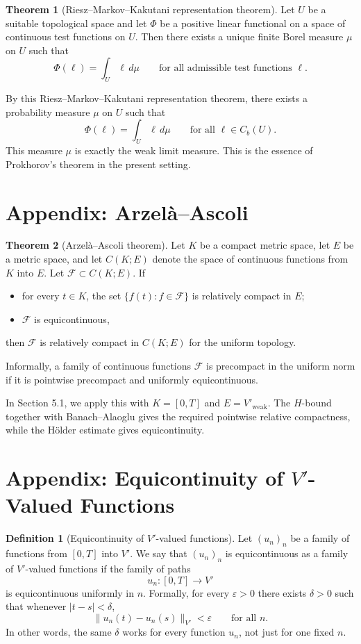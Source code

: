 \documentclass[11pt]{article}
\theoremstyle{definition}
\newtheorem{definition}{Definition}
\newtheorem{theorem}{Theorem}
\theoremstyle{remark}
\begin{document}
\begin{theorem}[Riesz--Markov--Kakutani representation theorem]
Let $U$ be a suitable topological space and let $\Phi$ be a positive linear functional on a space of continuous test functions on $U$. Then there exists a unique finite Borel measure $\mu$ on $U$ such that
\[
  \Phi(\ell)=\int_U \ell\,d\mu
  \qquad \text{for all admissible test functions } \ell.
\]
\end{theorem}

By this Riesz--Markov--Kakutani representation theorem, there exists a probability measure $\mu$ on $U$ such that
\[
  \Phi(\ell)=\int_U \ell\,d\mu
  \qquad \text{for all } \ell\in C_b(U).
\]
This measure $\mu$ is exactly the weak limit measure. This is the essence of Prokhorov's theorem in the present setting.

\section*{Appendix: Arzel\`a--Ascoli}
\begin{theorem}[Arzel\`a--Ascoli theorem]
Let $K$ be a compact metric space, let $E$ be a metric space, and let $C(K;E)$ denote the space of continuous functions from $K$ into $E$. Let $\mathcal F\subset C(K;E)$. If
\begin{itemize}
\item for every $t\in K$, the set $\{f(t):f\in \mathcal F\}$ is relatively compact in $E$;
\item $\mathcal F$ is equicontinuous,
\end{itemize}
then $\mathcal F$ is relatively compact in $C(K;E)$ for the uniform topology.
\end{theorem}

Informally, a family of continuous functions $\mathcal F$ is precompact in the uniform norm if it is pointwise precompact and uniformly equicontinuous.

In Section 5.1, we apply this with $K=[0,T]$ and $E=V'_{\mathrm{weak}}$. The $H$-bound together with Banach--Alaoglu gives the required pointwise relative compactness, while the H\"older estimate gives equicontinuity.

\section*{Appendix: Equicontinuity of $V'$-Valued Functions}
\begin{definition}[Equicontinuity of $V'$-valued functions]
Let $(u_n)_n$ be a family of functions from $[0,T]$ into $V'$. We say that $(u_n)_n$ is equicontinuous as a family of $V'$-valued functions if the family of paths
\[
  u_n:[0,T]\to V'
\]
is equicontinuous uniformly in $n$. Formally, for every $\varepsilon>0$ there exists $\delta>0$ such that whenever $|t-s|<\delta$,
\[
  \|u_n(t)-u_n(s)\|_{V'}<\varepsilon
  \qquad \text{for all } n.
\]
In other words, the same $\delta$ works for every function $u_n$, not just for one fixed $n$.
\end{definition}
\end{document}
